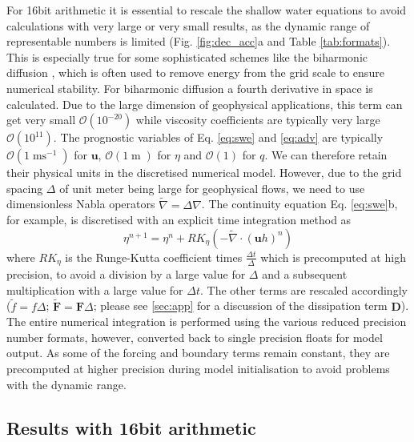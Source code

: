 \documentclass[draft]{agujournal2019}
\newcommand{\op}{\operatorname}
\begin{document}
For 16bit arithmetic it is essential to rescale the shallow water equations to avoid calculations with very large or very small results, as the dynamic range of representable numbers is limited (Fig. \ref{fig:dec_acc}a and Table \ref{tab:formats}). This is especially true for some sophisticated schemes like the biharmonic diffusion \cite{Griffies2000}, which is often used to remove energy from the grid scale to ensure numerical stability. For biharmonic diffusion a fourth derivative in space is calculated. Due to the large dimension of geophysical applications, this term can get very small $\mathcal{O}(10^{-20})$ while viscosity coefficients are typically very large $\mathcal{O}(10^{11})$. The prognostic variables of Eq. \ref{eq:swe} and \ref{eq:adv} are typically $\mathcal{O}(1\op{ms}^{-1})$ for $\mathbf{u}$, $\mathcal{O}(1\op{m})$ for $\eta$ and $\mathcal{O}(1)$ for $q$. We can therefore retain their physical units in the discretised numerical model. However, due to the grid spacing $\Delta$ of unit meter being large for geophysical flows, we need to use dimensionless Nabla operators $\tilde{\nabla} = \Delta\nabla$. The continuity equation Eq. \ref{eq:swe}b, for example, is discretised with an explicit time integration method as
\begin{equation}
\eta^{n+1} = \eta^n + RK_{\eta}\left( - \tilde{\nabla} \cdot (\mathbf{u}h)^n\right)
\label{eq:discr}
\end{equation}
where $RK_\eta$ is the Runge-Kutta coefficient times $\tfrac{\Delta t}{\Delta}$ which is precomputed at high precision, to avoid a division by a large value for $\Delta$ and a subsequent multiplication with a large value for $\Delta t$. The other terms are rescaled accordingly ($\tilde{f} = f\Delta$; $\tilde{\mathbf{F}} = \mathbf{F}\Delta$; please see \ref{sec:app} for a discussion of the dissipation term $\mathbf{D}$). The entire numerical integration is performed using the various reduced precision number formats, however, converted back to single precision floats for model output. As some of the forcing and boundary terms remain constant, they are precomputed at higher precision during model initialisation to avoid problems with the dynamic range.


\subsection{Results with 16bit arithmetic}
\end{document}
